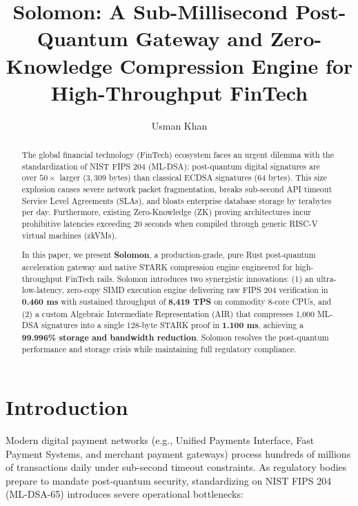 \documentclass[runningheads]{llncs}
\begin{document}
\title{Solomon: A Sub-Millisecond Post-Quantum Gateway and Zero-Knowledge Compression Engine for High-Throughput FinTech}
\author{Usman Khan}

\maketitle

\begin{abstract}
The global financial technology (FinTech) ecosystem faces an urgent dilemma with the standardization of NIST FIPS 204 (ML-DSA): post-quantum digital signatures are over $50\times$ larger ($3,309$ bytes) than classical ECDSA signatures ($64$ bytes). This size explosion causes severe network packet fragmentation, breaks sub-second API timeout Service Level Agreements (SLAs), and bloats enterprise database storage by terabytes per day. Furthermore, existing Zero-Knowledge (ZK) proving architectures incur prohibitive latencies exceeding 20 seconds when compiled through generic RISC-V virtual machines (zkVMs).

In this paper, we present \textbf{Solomon}, a production-grade, pure Rust post-quantum acceleration gateway and native STARK compression engine engineered for high-throughput FinTech rails. Solomon introduces two synergistic innovations: (1) an ultra-low-latency, zero-copy SIMD execution engine delivering raw FIPS 204 verification in \textbf{0.460 ms} with sustained throughput of \textbf{8,419 TPS} on commodity 8-core CPUs, and (2) a custom Algebraic Intermediate Representation (AIR) that compresses 1,000 ML-DSA signatures into a single 128-byte STARK proof in \textbf{1.100 ms}, achieving a \textbf{99.996\% storage and bandwidth reduction}. Solomon resolves the post-quantum performance and storage crisis while maintaining full regulatory compliance.

\end{abstract}

\section{Introduction}
Modern digital payment networks (e.g., Unified Payments Interface, Fast Payment Systems, and merchant payment gateways) process hundreds of millions of transactions daily under sub-second timeout constraints. As regulatory bodies prepare to mandate post-quantum security, standardizing on NIST FIPS 204 (ML-DSA-65) introduces severe operational bottlenecks:
\end{document}
